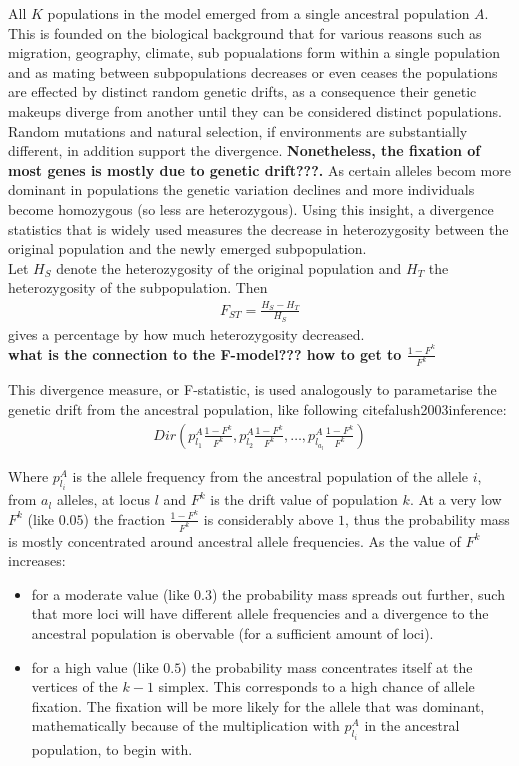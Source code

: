 \documentclass[a4paper, 11pt]{article}
\begin{document}
All $K$ populations in the model emerged from a single ancestral population $A$. This is founded on the biological background that for  various reasons such as migration, geography, climate, sub popualations form within a single population and as mating between subpopulations decreases or even ceases the populations are effected by distinct random genetic drifts, as a consequence their genetic makeups diverge from another until they can be considered distinct populations. Random mutations and natural selection, if environments are substantially different, in addition support the divergence. \textbf{Nonetheless, the fixation of most genes is mostly due to genetic drift???.} As certain alleles becom more dominant in populations the genetic variation declines and more individuals become homozygous (so less are heterozygous). Using this insight, a divergence statistics that is widely used measures the decrease in heterozygosity between the original population and the newly emerged subpopulation.\\
Let $H_S$ denote the heterozygosity of the original population and $H_T$ the heterozygosity of the subpopulation. Then
\begin{align*}
F_{ST} = \frac{H_S - H_T}{H_S}
\end{align*}
gives a percentage by how much heterozygosity decreased.\\

\textbf{what is the connection to the F-model??? how to get to $\frac{1-F^k}{F^k}$}

This divergence measure, or F-statistic, is used analogously to parametarise the genetic drift from the ancestral population, like following cite{falush2003inference}:
\begin{align}
Dir(p^A_{l_1} \frac{1 - F^k}{F^k}, p^A_{l_2} \frac{1 - F^k}{F^k}, \ldots , p^A_{l_{a_l}} \frac{1 - F^k}{F^k})
\end{align}

Where $p^A_{l_i}$ is the allele frequency from the ancestral population of the allele $i$, from $a_l$ alleles, at locus $l$ and $F^k$ is the drift value of population $k$. At a very low $F^k$ (like $0.05$) the fraction $\frac{1-F^k}{F^k}$ is considerably above $1$, thus the probability mass is mostly concentrated around ancestral allele frequencies. As the value of $F^k$ increases: 
\begin{itemize}
\item for a moderate value (like $0.3$) the probability mass spreads out further, such that more loci will have different allele frequencies and a divergence to the ancestral population is obervable (for a sufficient amount of loci).
\item for a high value (like $0.5$) the probability mass concentrates itself at the vertices of the $k-1$ simplex. This corresponds to a high chance of allele fixation. The fixation will be more likely for the allele that was dominant, mathematically because of the multiplication with $p^A_{l_i}$ in the ancestral population, to begin with. 
\end{itemize}
\end{document}
